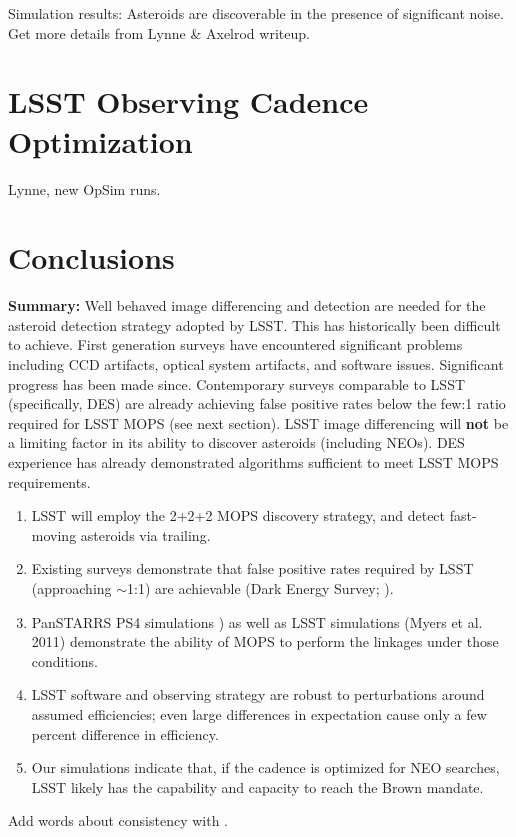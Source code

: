 \documentclass[12pt,preprint]{aastex}
\begin{document}
Simulation results: Asteroids are discoverable in the presence of significant noise.
Get more details from Lynne \& Axelrod writeup. 



\section{LSST Observing Cadence Optimization}

Lynne, new OpSim runs. 


\section{Conclusions}

{\bf Summary:} Well behaved image differencing and detection are needed for the
asteroid detection strategy adopted by LSST. This has historically
been difficult to achieve. First generation surveys have encountered
significant problems including CCD artifacts, optical system
artifacts, and software issues. Significant progress has been made
since. Contemporary surveys comparable to LSST (specifically, DES) are
already achieving false positive rates below the few:1 ratio required
for LSST MOPS (see next section). LSST image differencing will {\bf
not} be a limiting factor in its ability to discover asteroids
(including NEOs). DES experience has already demonstrated algorithms 
sufficient to meet LSST MOPS requirements.

\begin{enumerate}
\item LSST will employ the 2+2+2 MOPS discovery strategy, and detect fast-moving asteroids via trailing.
\item Existing surveys demonstrate that false positive rates required
  by LSST (approaching $\sim$1:1) are  achievable (Dark Energy Survey;  \citep{goldstein2015}).
\item PanSTARRS PS4 simulations \citep{denneau13}) as well as LSST
  simulations (Myers et al. 2011) demonstrate the ability of MOPS to perform the linkages under those conditions.
\item LSST software and observing strategy are robust to perturbations
  around assumed efficiencies; even large differences in expectation
  cause only a few percent difference in efficiency. 
\item Our simulations indicate that, if the cadence is optimized for
          NEO searches, LSST likely has the capability and capacity to reach the Brown mandate.
\end{enumerate}

Add words about consistency with \cite{GMS2016}. 

\appendix
 





\end{document}
